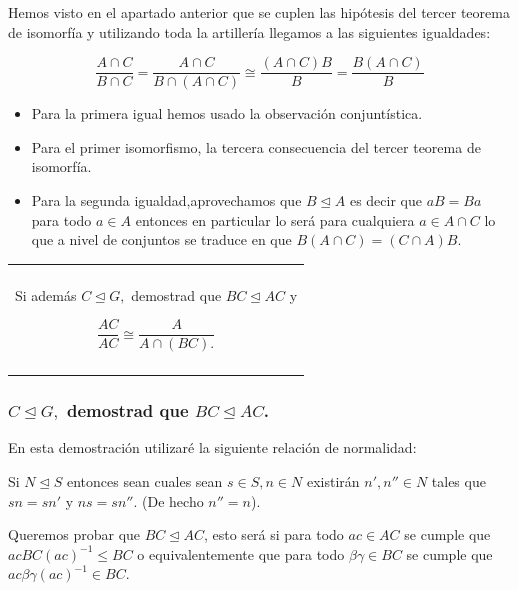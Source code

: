 \documentclass[12pt]{article}
\newenvironment{micaja}
{
    \begin{center}
    \begin{tabular}{|p{0.9\textwidth}|}
    \hline\\
    }   
    {   
    \\\\\hline
    \end{tabular} 
    \end{center}
    }
\begin{document}

Hemos visto en el apartado anterior que se cuplen las hipótesis 
 del tercer teorema de isomorfía y utilizando toda la artillería llegamos 
 a las siguientes igualdades: 

 \begin{equation*}
    \frac{A \cap C}{B \cap C} = \frac{A \cap C}{B \cap (A \cap C)} \cong \frac{(A \cap C)B}{B}
    = \frac{B(A \cap C)}{B}
 \end{equation*}
\begin{itemize}
    \item Para la primera igual hemos usado la observación conjuntística.
    \item Para el primer isomorfismo, la tercera consecuencia del 
    tercer teorema de isomorfía. 
    \item Para la segunda igualdad,aprovechamos que $B \trianglelefteq A$ es decir que  $aB = Ba$ para todo $a \in A$
    entonces en particular lo será para cualquiera $a \in A\cap C$
    lo que a nivel de conjuntos se traduce en que $B(A\cap C) = (C \cap A) B.$
   
\end{itemize}
 


\begin{micaja}
    Si además $C \trianglelefteq G,$ demostrad que $BC \trianglelefteq AC$ y 

    \begin{equation*}
        \frac{AC}{AC} \cong \frac{A}{A \cap (BC).}
    \end{equation*}
\end{micaja}
    
\subsubsection*{$C \trianglelefteq G,$ demostrad que $BC \trianglelefteq AC$.}
En esta demostración utilizaré la siguiente relación de normalidad: 

Si $N \trianglelefteq S$ entonces sean cuales sean $s \in S, n \in N$ existirán $n',n'' \in N$
tales que $sn = sn'$ y $ns = sn''.$ (De hecho $n'' = n$).

Queremos probar que $BC \trianglelefteq AC$, 
esto será si para todo $ac  \in AC$ se cumple que $ac BC (ac)^{-1} \leq BC$ o 
equivalentemente que para todo $\beta \gamma \in BC$ se cumple que $ac \beta \gamma (ac)^{-1} \in BC.$
\end{document}
